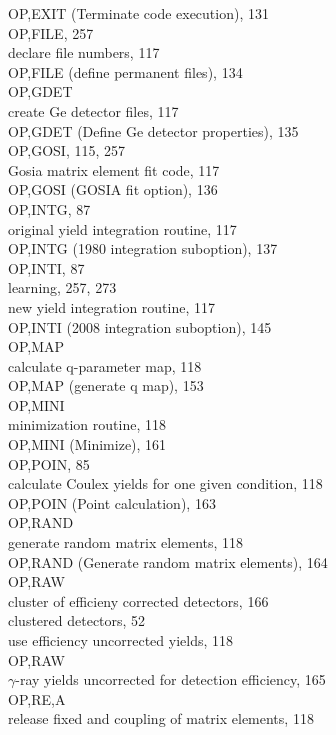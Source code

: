 \documentclass[10pt]{article}
\begin{document}
OP,EXIT (Terminate code execution), 131\\
OP,FILE, 257\\
declare file numbers, 117\\
OP,FILE (define permanent files), 134\\
OP,GDET\\
create Ge detector files, 117\\
OP,GDET (Define Ge detector properties), 135\\
OP,GOSI, 115, 257\\
Gosia matrix element fit code, 117\\
OP,GOSI (GOSIA fit option), 136\\
OP,INTG, 87\\
original yield integration routine, 117\\
OP,INTG (1980 integration suboption), 137\\
OP,INTI, 87\\
learning, 257, 273\\
new yield integration routine, 117\\
OP,INTI (2008 integration suboption), 145\\
OP,MAP\\
calculate q-parameter map, 118\\
OP,MAP (generate q map), 153\\
OP,MINI\\
minimization routine, 118\\
OP,MINI (Minimize), 161\\
OP,POIN, 85\\
calculate Coulex yields for one given condition, 118\\
OP,POIN (Point calculation), 163\\
OP,RAND\\
generate random matrix elements, 118\\
OP,RAND (Generate random matrix elements), 164\\
OP,RAW\\
cluster of efficieny corrected detectors, 166\\
clustered detectors, 52\\
use efficiency uncorrected yields, 118\\
OP,RAW\\
$\gamma$-ray yields uncorrected for detection efficiency, 165\\
OP,RE,A\\
release fixed and coupling of matrix elements, 118\\
\end{document}
